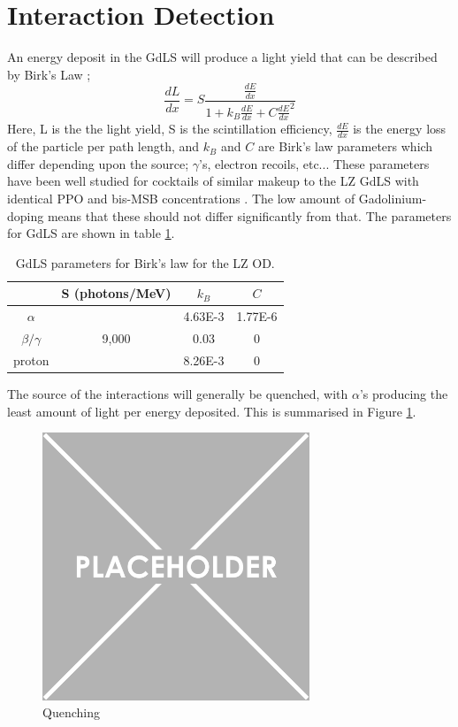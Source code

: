 \section{Interaction Detection}
\label{sec:od_physics}
\par
An energy deposit in the GdLS will produce a light yield that can be described by Birk's Law \cite{birks_law_ref};
\begin{equation} 
    \frac{dL}{dx} = S \frac{\frac{dE}{dx}}{1 + k_{B}\frac{dE}{dx} + C\frac{dE}{dx}^2}
    \label{eq:birkslaw}
\end{equation}
Here, L is the the light yield, S is the scintillation efficiency, $\frac{dE}{dx}$ is the energy loss of the particle per path length, and $k_{B}$ and $C$ are Birk's law parameters which differ depending upon the source; $\gamma$'s, electron recoils, etc...
These parameters have been well studied for cocktails of similar makeup to the LZ GdLS with identical PPO and bis-MSB concentrations \cite{ls_alpha_quenching_ref,ls_proton_quenching_ref}.
The low amount of Gadolinium-doping means that these should not differ significantly from that.
The parameters for GdLS are shown in table \ref{tab:Birks_law_parameters}.
\begin{table}[!htbp]
    \centering
    \begin{tabular}{c | c | c | c }
                   & S (photons/MeV) & $k_{B}$ & $C$ \\ \hline
    $\alpha$       &                 & 4.63E-3 & 1.77E-6 \\
    $\beta/\gamma$ & 9,000           & 0.03    & 0 \\ 
    proton         &                 & 8.26E-3 & 0
    \end{tabular}
    \caption{GdLS parameters for Birk's law for the LZ OD.}
    \label{tab:Birks_law_parameters}
\end{table} 

\par
The source of the interactions will generally be quenched, with $\alpha$'s producing the least amount of light per energy deposited.
This is summarised in Figure \ref{fig:gdls_quenching}.

\begin{figure}[!htbp]%
    \centering
    \includegraphics[height=8cm]{Figures/Placeholder.png}
    \caption{Quenching}
    \label{fig:gdls_quenching}
\end{figure}

